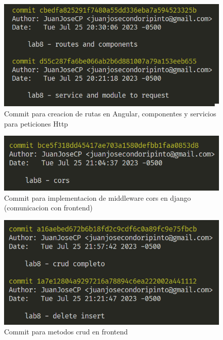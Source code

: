 \documentclass{article}
\begin{document}
        \begin{figure}
            \centering
            \includegraphics{img/commit4.png}
            \caption{Commit para creacion de rutas en Angular, componentes y servicios para peticiones Http}
            \label{fig:enter-label}
        \end{figure}
        \begin{figure}
            \centering
            \includegraphics{img/commit5.png}
            \caption{Commit para implementacion de middleware cors en django (comunicacion con frontend)}
            \label{fig:enter-label}
        \end{figure}
        \begin{figure}
            \centering
            \includegraphics{img/commit6.png}
            \caption{Commit para metodos crud en frontend}
            \label{fig:enter-label}
        \end{figure}
    \newpage
        
\end{document}
